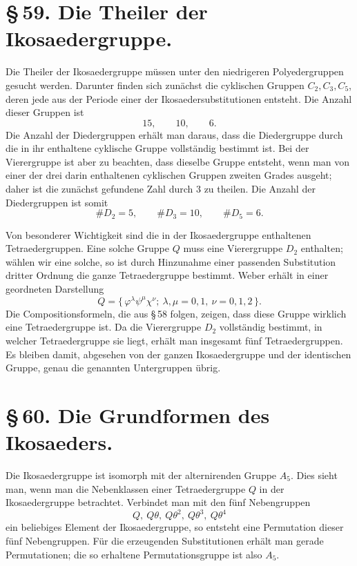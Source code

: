 \documentclass[11pt]{article}
\begin{document}
\section*{\S\,59. Die Theiler der Ikosaedergruppe.}

Die Theiler der Ikosaedergruppe müssen unter den niedrigeren Polyedergruppen gesucht werden. Darunter finden sich zunächst die cyklischen Gruppen $C_2,C_3,C_5$, deren jede aus der Periode einer der Ikosaedersubstitutionen entsteht. Die Anzahl dieser Gruppen ist
\[
 15,\qquad 10,\qquad 6.
\]
Die Anzahl der Diedergruppen erhält man daraus, dass die Diedergruppe durch die in ihr enthaltene cyklische Gruppe vollständig bestimmt ist. Bei der Vierergruppe ist aber zu beachten, dass dieselbe Gruppe entsteht, wenn man von einer der drei darin enthaltenen cyklischen Gruppen zweiten Grades ausgeht; daher ist die zunächst gefundene Zahl durch $3$ zu theilen. Die Anzahl der Diedergruppen ist somit
\[
 \#D_2=5,\qquad \#D_3=10,\qquad \#D_5=6.
\]

Von besonderer Wichtigkeit sind die in der Ikosaedergruppe enthaltenen Tetraedergruppen. Eine solche Gruppe $Q$ muss eine Vierergruppe $D_2$ enthalten; wählen wir eine solche, so ist durch Hinzunahme einer passenden Substitution dritter Ordnung die ganze Tetraedergruppe bestimmt. Weber erhält in einer geordneten Darstellung
\begin{equation}
 Q=\{\,\varphi^\lambda\psi^\mu\chi^\nu;\ \lambda,\mu=0,1,\ \nu=0,1,2\,\}.
\tag{1}
\end{equation}
Die Compositionsformeln, die aus \S\,58 folgen, zeigen, dass diese Gruppe wirklich eine Tetraedergruppe ist. Da die Vierergruppe $D_2$ vollständig bestimmt, in welcher Tetraedergruppe sie liegt, erhält man insgesamt fünf Tetraedergruppen. Es bleiben damit, abgesehen von der ganzen Ikosaedergruppe und der identischen Gruppe, genau die genannten Untergruppen übrig.

\section*{\S\,60. Die Grundformen des Ikosaeders.}

Die Ikosaedergruppe ist isomorph mit der alternirenden Gruppe $A_5$. Dies sieht man, wenn man die Nebenklassen einer Tetraedergruppe $Q$ in der Ikosaedergruppe betrachtet. Verbindet man mit den fünf Nebengruppen
\[
 Q,\ Q\theta,\ Q\theta^2,\ Q\theta^3,\ Q\theta^4
\]
ein beliebiges Element der Ikosaedergruppe, so entsteht eine Permutation dieser fünf Nebengruppen. Für die erzeugenden Substitutionen erhält man gerade Permutationen; die so erhaltene Permutationsgruppe ist also $A_5$.
\end{document}
